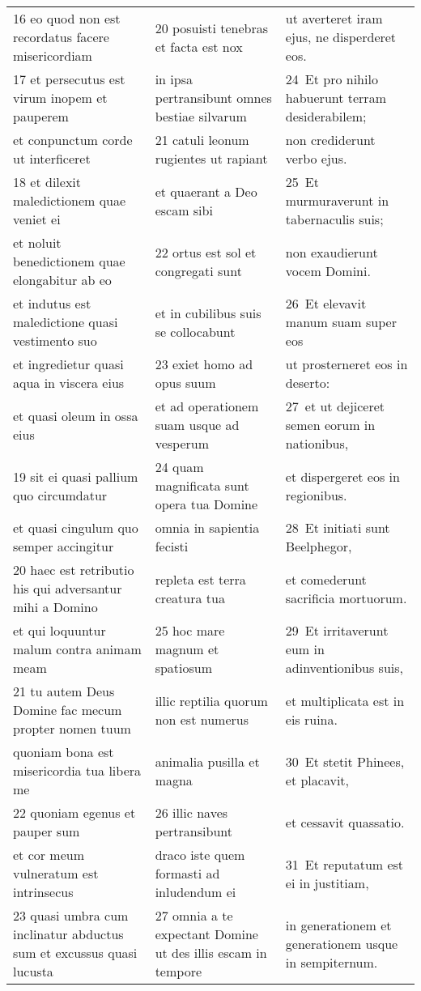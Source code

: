 \documentclass{article}
\begin{document}
\begin{longtable}{@{}p{}p{}p{}@{}}
16 eo quod non est recordatus facere misericordiam	&	20 posuisti tenebras et facta est nox	&	ut averteret iram ejus, ne disperderet eos.	\\
17 et persecutus est virum inopem et pauperem	&	in ipsa pertransibunt omnes bestiae silvarum	&	24 Et pro nihilo habuerunt terram desiderabilem;	\\
et conpunctum corde ut interficeret	&	21 catuli leonum rugientes ut rapiant	&	non crediderunt verbo ejus.	\\
18 et dilexit maledictionem quae veniet ei	&	et quaerant a Deo escam sibi	&	25 Et murmuraverunt in tabernaculis suis;	\\
et noluit benedictionem quae elongabitur ab eo	&	22 ortus est sol et congregati sunt	&	non exaudierunt vocem Domini.	\\
et indutus est maledictione quasi vestimento suo	&	et in cubilibus suis se collocabunt	&	26 Et elevavit manum suam super eos	\\
et ingredietur quasi aqua in viscera eius	&	23 exiet homo ad opus suum	&	ut prosterneret eos in deserto:	\\
et quasi oleum in ossa eius	&	et ad operationem suam usque ad vesperum	&	27 et ut dejiceret semen eorum in nationibus,	\\
19 sit ei quasi pallium quo circumdatur	&	24 quam magnificata sunt opera tua Domine	&	et dispergeret eos in regionibus.	\\
et quasi cingulum quo semper accingitur	&	omnia in sapientia fecisti	&	28 Et initiati sunt Beelphegor,	\\
20 haec est retributio his qui adversantur mihi a Domino	&	repleta est terra creatura tua	&	et comederunt sacrificia mortuorum.	\\
et qui loquuntur malum contra animam meam	&	25 hoc mare magnum et spatiosum	&	29 Et irritaverunt eum in adinventionibus suis,	\\
21 tu autem Deus Domine fac mecum propter nomen tuum	&	illic reptilia quorum non est numerus	&	et multiplicata est in eis ruina.	\\
quoniam bona est misericordia tua libera me	&	animalia pusilla et magna	&	30 Et stetit Phinees, et placavit,	\\
22 quoniam egenus et pauper sum	&	26 illic naves pertransibunt	&	et cessavit quassatio.	\\
et cor meum vulneratum est intrinsecus	&	draco iste quem formasti ad inludendum ei	&	31 Et reputatum est ei in justitiam,	\\
23 quasi umbra cum inclinatur abductus sum et excussus quasi lucusta	&	27 omnia a te expectant Domine ut des illis escam in tempore	&	in generationem et generationem usque in sempiternum.	\\

\end{longtable}
\end{document}
